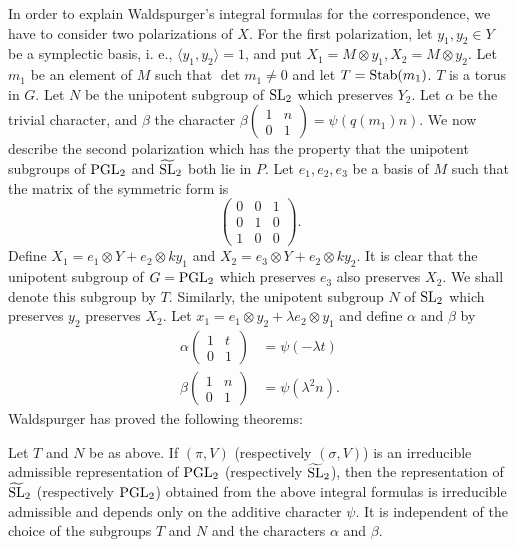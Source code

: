 In order to explain Waldspurger's integral formulas for the correspondence, we have to consider two polarizations of $X$. For the first polarization, let $y_1, y_2 \in Y$ be a symplectic basis, i. e., $\langle y_1, y_2 \rangle = 1$,
and put $X_1 = M \otimes y_1, X_2 = M \otimes y_2$.
Let $m_1$ be an element of $M$ such that $\det m_1 \neq 0$ and let $T = \mathrm{Stab}(m_1)$.
$T$ is a torus in $G$.
Let $N$ be the unipotent subgroup of $\mathrm{SL}_2$ which preserves $Y_2$.
Let $\alpha$ be the trivial character, and $\beta$ the character $\beta\left(\begin{smallmatrix} 1 & n \\ 0 & 1\end{smallmatrix}\right) = \psi(q(m_1)n)$.
We now describe the second polarization which has the property that the unipotent subgroups of $\mathrm{PGL}_2$ and $\widetilde{\mathrm{SL}}_2$ both lie in $P$.
Let $e_1, e_2, e_3$ be a basis of $M$ such that the matrix of the symmetric form is
\[
\begin{pmatrix}
0 & 0 & 1 \\ 0 & 1 & 0 \\ 1 & 0 & 0
\end{pmatrix}.
\]
Define $X_1 = e_1 \otimes Y + e_2 \otimes ky_1$ and $X_2 = e_3 \otimes Y + e_2 \otimes ky_2$.
It is clear that the unipotent subgroup of $G = \mathrm{PGL}_2$ which preserves $e_3$ also preserves $X_2$.
We shall denote this subgroup by $T$. Similarly, the unipotent subgroup $N$ of $\mathrm{SL}_2$ which preserves $y_2$ preserves $X_2$.
Let $x_1 = e_1 \otimes y_2 + \lambda e_2 \otimes y_1$ and define $\alpha$ and $\beta$ by
\begin{align*}
    \alpha\begin{pmatrix}
        1 & t \\ 0 & 1
    \end{pmatrix} &= \psi(-\lambda t) \\
    \beta\begin{pmatrix}
        1 & n \\ 0 & 1
    \end{pmatrix} &= \psi(\lambda^2 n).
\end{align*}
Waldspurger has proved the following theorems:
\begin{theorem}
\label{thm:2.1}
Let $T$ and $N$ be as above.
If $(\pi, V)$ (respectively $(\sigma, V)$) is an irreducible admissible representation of $\mathrm{PGL}_2$ (respectively $\widetilde{\mathrm{SL}}_2$), then the representation of $\widetilde{\mathrm{SL}}_2$ (respectively $\mathrm{PGL}_2$) obtained from the above integral formulas is irreducible admissible and depends only on the additive character $\psi$.
It is independent of the choice of the subgroups $T$ and $N$ and the characters $\alpha$ and $\beta$.
\end{theorem}
